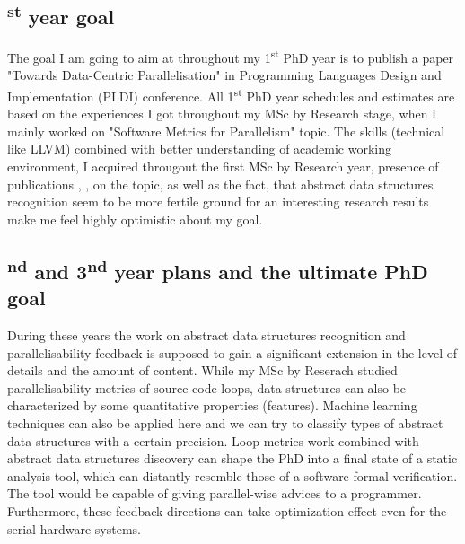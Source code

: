 \documentclass[12pt, a4paper]{article}
\begin{document}
\subsection*{\textsuperscript{st} year goal}
\qquad The goal I am going to aim at throughout my 1\textsuperscript{st} PhD year is to publish a paper "Towards Data-Centric Parallelisation" in Programming Languages Design and Implementation (PLDI) conference.\newline
\null\qquad All 1\textsuperscript{st} PhD year schedules and estimates are based on the experiences I got throughout my MSc by Research stage, when I mainly worked on "Software Metrics for Parallelism" topic. The skills (technical like LLVM) combined with better understanding of academic working environment, I acquired througout the first MSc by Research year, presence of publications \cite{algorithmic-skeletons-recognition-paper}, \cite{general-reductions-recognition-paper}, \cite{idioms-recognition-paper} on the topic, as well as the fact, that abstract data structures recognition seem to be more fertile ground for an interesting research results make me feel highly optimistic about my goal.

\subsection*{\textsuperscript{nd} and 3\textsuperscript{nd} year plans and the ultimate PhD goal}
\qquad During these years the work on abstract data structures recognition and parallelisability feedback is supposed to gain a significant extension in the level of details and the amount of content. While my MSc by Reserach studied parallelisability metrics of source code loops, data structures can also be characterized by some quantitative properties (features). Machine learning techniques can also be applied here and we can try to classify types of abstract data structures with a certain precision.\newline 
\null\qquad Loop metrics work combined with abstract data structures discovery can shape the PhD into a final state of a static analysis tool, which can distantly resemble those of a software formal verification. The tool would be capable of giving parallel-wise advices to a programmer. Furthermore, these feedback directions can take optimization effect even for the serial hardware systems.




\end{document}
